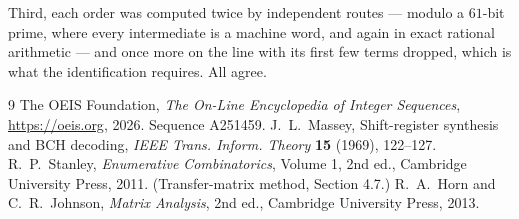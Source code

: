 \documentclass[11pt,a4paper]{article}
\theoremstyle{plain}
\theoremstyle{definition}
\begin{document}
Third, each order was computed twice by independent routes --- modulo a $61$-bit prime, where
every intermediate is a machine word, and again in exact rational arithmetic --- and once more
on the line with its first few terms dropped, which is what the identification requires. All
agree.

\begin{thebibliography}{9}
 The OEIS Foundation, \emph{The On-Line Encyclopedia of Integer
Sequences}, \url{https://oeis.org}, 2026. Sequence A251459.
 J.~L.~Massey, Shift-register synthesis and BCH decoding, \emph{IEEE
Trans. Inform. Theory} \textbf{15} (1969), 122--127.
 R.~P.~Stanley, \emph{Enumerative Combinatorics}, Volume 1, 2nd ed.,
Cambridge University Press, 2011. (Transfer-matrix method, Section 4.7.)
 R.~A.~Horn and C.~R.~Johnson, \emph{Matrix Analysis}, 2nd ed., Cambridge
University Press, 2013.
\end{thebibliography}
\end{document}
